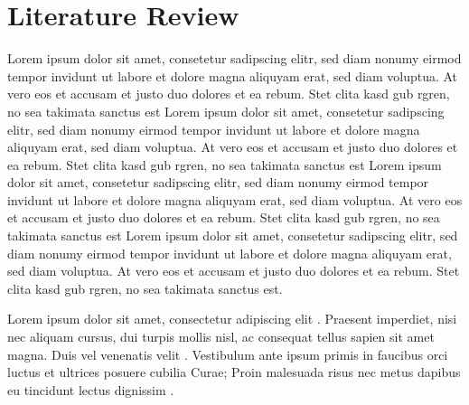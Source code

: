 \section{Literature Review}\label{literaturereview}

Lorem ipsum dolor sit amet, consetetur sadipscing elitr, sed diam nonumy eirmod tempor invidunt ut labore et dolore magna aliquyam erat, sed diam voluptua. At vero eos et accusam et justo duo dolores et ea rebum. Stet clita kasd gub rgren, no sea takimata sanctus est Lorem ipsum dolor sit amet, consetetur sadipscing elitr, sed diam nonumy eirmod tempor invidunt ut labore et dolore magna aliquyam erat, sed diam voluptua. At vero eos et accusam et justo duo dolores et ea rebum. Stet clita kasd gub rgren, no sea takimata sanctus est Lorem ipsum dolor sit amet, consetetur sadipscing elitr, sed diam nonumy eirmod tempor invidunt ut labore et dolore magna aliquyam erat, sed diam voluptua. At vero eos et accusam et justo duo dolores et ea rebum. Stet clita kasd gub rgren, no sea takimata sanctus est Lorem ipsum dolor sit amet, consetetur sadipscing elitr, sed diam nonumy eirmod tempor invidunt ut labore et dolore magna aliquyam erat, sed diam voluptua. At vero eos et accusam et justo duo dolores et ea rebum. Stet clita kasd gub rgren, no sea takimata sanctus est.

Lorem ipsum dolor sit amet, consectetur adipiscing elit \cite{HYP:HYP57}. Praesent imperdiet, nisi nec aliquam cursus, dui turpis mollis nisl, ac consequat tellus sapien sit amet magna. Duis vel venenatis velit \cite{Box:1990:TSA:574978}. Vestibulum ante ipsum primis in faucibus orci luctus et ultrices posuere cubilia Curae; Proin malesuada risus nec metus dapibus eu tincidunt lectus dignissim \cite{17590413}. 